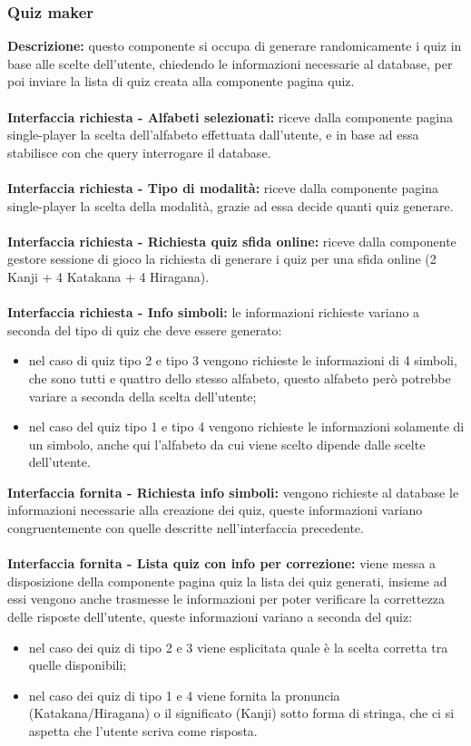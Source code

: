 \subsubsection{Quiz maker}
\textbf{Descrizione: }questo componente si occupa di generare randomicamente i quiz in base alle scelte dell'utente, chiedendo le informazioni necessarie al database, per poi inviare la lista di quiz creata alla componente pagina quiz.\\
\\
\textbf{Interfaccia richiesta - Alfabeti selezionati: }riceve dalla componente pagina single-player la scelta dell'alfabeto effettuata dall'utente, e in base ad essa stabilisce con che query interrogare il database.\\
\\
\textbf{Interfaccia richiesta - Tipo di modalità: }riceve dalla componente pagina single-player la scelta della modalità, grazie ad essa decide quanti quiz generare. \\
\\
\textbf{Interfaccia richiesta - Richiesta quiz sfida online: }riceve dalla componente gestore sessione di gioco la richiesta di generare i quiz per una sfida online (2 Kanji + 4 Katakana + 4 Hiragana).\\
\\
\textbf{Interfaccia richiesta - Info simboli: }le informazioni richieste variano a seconda del tipo di quiz che deve essere generato:
\begin{itemize}
    \item nel caso di quiz tipo 2 e tipo 3 vengono richieste le informazioni di 4 simboli, che sono tutti e quattro dello stesso alfabeto, questo alfabeto però potrebbe variare a seconda della scelta dell'utente;
    \item nel caso del quiz tipo 1 e tipo 4 vengono richieste le informazioni solamente di un simbolo, anche qui l'alfabeto da cui viene scelto dipende dalle scelte dell'utente.
\end{itemize}
\noindent
\textbf{Interfaccia fornita - Richiesta info simboli: }vengono richieste al database le informazioni necessarie alla creazione dei quiz, queste informazioni variano congruentemente con quelle descritte nell'interfaccia precedente.\\
\\
\textbf{Interfaccia fornita - Lista quiz con info per correzione: }viene messa a disposizione della componente pagina quiz la lista dei quiz generati, insieme ad essi vengono anche trasmesse le informazioni per poter verificare la correttezza delle risposte dell'utente, queste informazioni variano a seconda del quiz:
\begin{itemize}
    \item nel caso dei quiz di tipo 2 e 3 viene esplicitata quale è la scelta corretta tra quelle disponibili;
    \item nel caso dei quiz di tipo 1 e 4 viene fornita la pronuncia (Katakana/Hiragana) o il significato (Kanji) sotto forma di stringa, che ci si aspetta che l'utente scriva come risposta. 
\end{itemize}
\noindent

